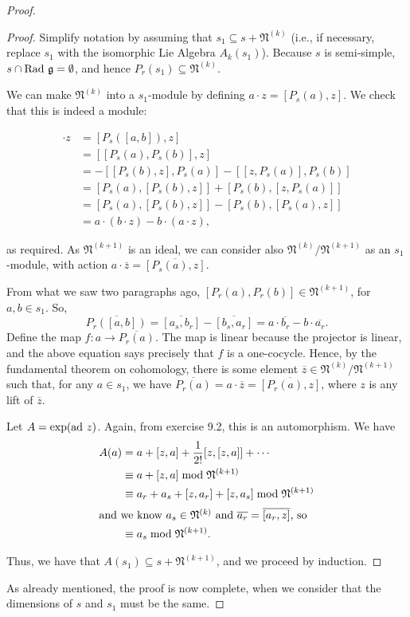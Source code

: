 \documentclass{amsart}
\newcommand*{\g}{\mathfrak{g}}
\newcommand*{\gN}{\mathfrak{N}}
\newcommand*{\rg}{\textnormal{Rad }\g}
\newcommand*{\ad}{\textnormal{ad }}
\begin{document}
\begin{proof}
\begin{proof}
Simplify notation by assuming that $s_{1} \subseteq s + \gN^{(k)}$
(i.e., if necessary, replace $s_{1}$ with the isomorphic Lie Algebra
$A_{k}(s_{1})$).  Because $s$ is semi-simple, $s \cap \rg =
\emptyset$, and hence $P_{r}(s_{1}) \subseteq \gN^{(k)}$.

We can make $\gN^{(k)}$ into a $s_{1}$-module by defining $a\cdot z=
[P_{s}(a),z]$.  We check that this is indeed a module:

\begin{align*}
[a,b] \cdot z & = [P_{s}([a,b]),z] \\
& = [[P_{s}(a),P_{s}(b)],z] \\
& = -[[P_{s}(b),z],P_{s}(a)] - [[z,P_{s}(a)],P_{s}(b)] \\
& = [P_{s}(a),[P_{s}(b),z]] + [P_{s}(b),[z,P_{s}(a)]] \\
& = [P_{s}(a),[P_{s}(b),z]] - [P_{s}(b),[P_{s}(a),z]] \\
& = a \cdot (b \cdot z) - b \cdot (a \cdot z),
\end{align*}

\noindent as required.  As $\gN^{(k+1)}$ is an ideal, we can
consider also $\gN^{(k)}/\gN^{(k+1)}$ as an $s_{1}$-module, with
action $a \cdot \overline{z} = \overline{[P_{s}(a),z]}$.

From what we saw two paragraphs ago, $[P_{r}(a),P_{r}(b)] \in
\gN^{(k+1)}$, for $a,b \in s_{1}$.  So, $$\overline{P_{r}([a,b])} =
\overline{[a_{s},b_{r}]} - \overline{[b_{s},a_{r}]} = a \cdot
\overline{b_{r}} - b \cdot \overline{a_{r}}.$$  Define the map $f: a
\rightarrow \overline{P_{r}(a)}$.  The map is linear because the
projector is linear, and the above equation says precisely that $f$
is a one-cocycle.  Hence, by the fundamental theorem on cohomology,
there is some element $\overline{z} \in \gN^{(k)}/\gN^{(k+1)}$ such
that, for any $a \in s_{1}$, we have $\overline{P_{r}(a)} = a \cdot
\overline{z} = \overline{[P_{r}(a),z]}$, where $z$ is any lift of
$\overline{z}$.

Let $A = \exp(\ad z)$.  Again, from exercise 9.2, this is an
automorphism.  We have
\begin{align*}
A(a) & = a + [z,a] + \frac{1}{2!}[z,[z,a]] + \cdots \\
& \equiv a + [z,a] \bmod \gN^{(k+1)} \\
& \equiv a_{r} + a_{s} + [z,a_{r}] + [z,a_{s}] \bmod \gN^{(k+1)} \\
\intertext{and we know $a_{s} \in \gN^{(k)}$ and $\overline{a_{r}} =
\overline{[a_{r},z]}$, so} & \equiv a_{s} \bmod \gN^{(k+1)}.
\end{align*}

\noindent Thus, we have that $A(s_{1}) \subseteq s + \gN^{(k+1)}$,
and we proceed by induction.

\end{proof}

\noindent As already mentioned, the proof is now complete, when we
consider that the dimensions of $s$ and $s_{1}$ must be the same.
\end{proof}
\end{document}
